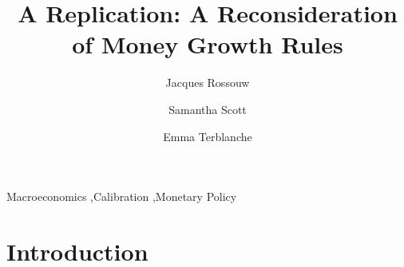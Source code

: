 \documentclass[11pt,preprint, authoryear]{elsarticle}
\numberwithin{equation}{section}
\numberwithin{figure}{section}
\numberwithin{table}{section}
\begin{document}
\begin{frontmatter}  %

\title{A Replication: A Reconsideration of Money Growth Rules}





\author[Add1]{Jacques Rossouw}

\author[Add1]{Samantha Scott}

\author[Add1,Add2]{Emma Terblanche}



\address[Add1]{Stellenbosch University, Cape Town, South Africa}



\vspace{1cm}


\begin{keyword}
\footnotesize{
Macroeconomics \sep Calibration \sep Monetary Policy \\
\vspace{0.3cm}
}
\end{keyword}



\vspace{0.5cm}

\end{frontmatter}


\newpage
\renewcommand{\contentsname}{Table of Contents}
{\tableofcontents}
\newpage

\pagestyle{fancy}
\chead{}
\rhead{}
\lfoot{}
\lhead{}
\cfoot{}


\headsep 35pt %




\newpage

\hypertarget{introduction}{%
\section{Introduction}\label{introduction}}
\end{document}
